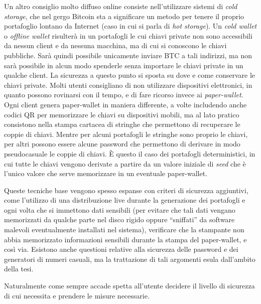 Un altro consiglio molto diffuso online consiste nell'utilizzare sistemi di \emph{cold storage}, che nel gergo Bitcoin sta a significare un metodo per tenere il proprio portafoglio lontano da Internet (caso in cui si parla di \emph{hot storage}). Un \emph{cold wallet} o \emph{offline wallet} risulterà in un portafogli le cui chiavi private non sono accessibili da nessun client e da nessuna macchina, ma di cui si conoscono le chiavi pubbliche. Sarà quindi possibile unicamente inviare BTC a tali indirizzi, ma non sarà possibile in alcun modo spenderle senza importare le chiavi private in un qualche client.
La sicurezza a questo punto si sposta su dove e come conservare le chiavi private. Molti utenti consigliano di non utilizzare dispositivi elettronici, in quanto possono rovinarsi con il tempo, e di fare ricorso invece ai \emph{paper-wallet}. Ogni client genera paper-wallet in maniera differente, a volte includendo anche codici QR per memorizzare le chiavi su dispositivi mobili, ma al lato pratico consistono nella stampa cartacea di stringhe che permettono di recuperare le coppie di chiavi.
Mentre per alcuni portafogli le stringhe sono proprio le chiavi, per altri possono essere alcune password che permettono di derivare in modo pseudocasuale le coppie di chiavi. È questo il caso dei portafogli deterministici, in cui tutte le chiavi vengono derivate a partire da un valore iniziale di \emph{seed} che è l'unico valore che serve memorizzare in un eventuale paper-wallet.

Queste tecniche base vengono spesso espanse con criteri di sicurezza aggiuntivi, come l'utilizzo di una distribuzione live durante la generazione dei portafogli e ogni volta che si immettono dati sensibili (per evitare che tali dati vengano memorizzati da qualche parte nel disco rigido oppure ``sniffati'' da software malevoli eventualmente installati nel sistema), verificare che la stampante non abbia memorizzato informazioni sensibili durante la stampa del paper-wallet, e così via.
Esistono anche questioni relative alla sicurezza delle password e dei generatori di numeri casuali, ma la trattazione di tali argomenti esula dall'ambito della tesi.

Naturalmente come sempre accade spetta all'utente decidere il livello di sicurezza di cui necessita e prendere le misure necessarie.

